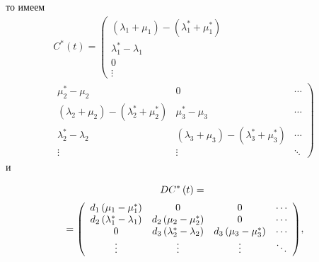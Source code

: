 \begin{multicols}{2}
\noindent
 то имеем
\begin{multline*}
C^*\left( t\right) =
 \left(
\begin{array}{c}
  \left( \lambda_1 +\mu_1\right)-\left( \lambda_1^* +\mu_1^*\right)                                         \\
  \lambda_1^*-\lambda_1                                                      \\
  0                                                                                                   \\
\vdots                                                                      
\end{array}
\right.\\[3pt]
\left.
\begin{array}{ccc}
 \mu_2^*- \mu_2 &  0                                                                 & \cdots \\
 \left( \lambda_2 +\mu_2\right)-\left( \lambda_2^* +\mu_2^*\right)&  \mu_3^* - \mu_3                              & \cdots \\
 \lambda_2^*-\lambda_2&  \left( \lambda_3 +\mu_3\right)-\left( \lambda_3^* +\mu_3^*\right) & \cdots \\
\vdots &\vdots                                        & \ddots 
\end{array}
\right)
\end{multline*}
и


\columnbreak

\noindent
\begin{multline*}
DC^*\left( t\right) ={}\\[2pt]
{}={ %
\left(
\begin{array}{cccc}
  d_1\left( \mu_1-\mu_1^*\right)                                & 0                                               
& 0                                                            & \cdots \\
  d_2\left(\lambda_1^*-\lambda_1 \right)                        & 
d_2\left( \mu_2-\mu_2^*\right)             & 0                                                            
& \cdots \\
  0                                                                  & 
d_3\left(\lambda_2^*-\lambda_2\right)      & d_3\left( \mu_3-
\mu_3^*\right)                          & \cdots \\
\vdots                                                               & \vdots                                          
& \vdots                                                       & \ddots \\
\end{array}
\right)},
\end{multline*}


\end{multicols}
